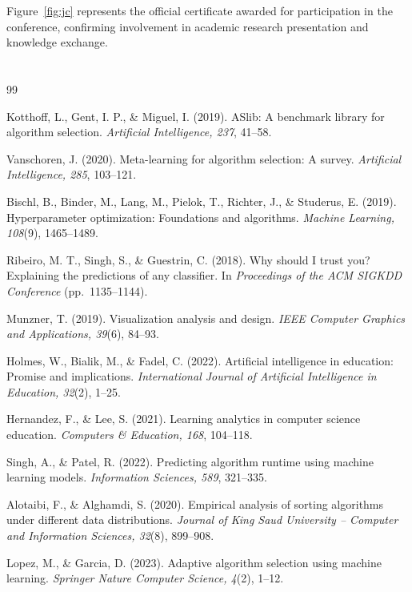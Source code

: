 \documentclass[12pt,a4paper,oneside,openany]{report}
\begin{document}
Figure~\ref{fig:jc} represents the official certificate awarded for participation in the conference, confirming involvement in academic research presentation and knowledge exchange.


\section*{}
\begin{thebibliography}{99}

Kotthoff, L., Gent, I. P., \& Miguel, I. (2019).
ASlib: A benchmark library for algorithm selection.
\textit{Artificial Intelligence, 237}, 41--58.

Vanschoren, J. (2020).
Meta-learning for algorithm selection: A survey.
\textit{Artificial Intelligence, 285}, 103--121.

Bischl, B., Binder, M., Lang, M., Pielok, T., Richter, J., \& Studerus, E. (2019).
Hyperparameter optimization: Foundations and algorithms.
\textit{Machine Learning, 108}(9), 1465--1489.

Ribeiro, M. T., Singh, S., \& Guestrin, C. (2018).
Why should I trust you? Explaining the predictions of any classifier.
In \textit{Proceedings of the ACM SIGKDD Conference} (pp.~1135--1144).

Munzner, T. (2019).
Visualization analysis and design.
\textit{IEEE Computer Graphics and Applications, 39}(6), 84--93.

Holmes, W., Bialik, M., \& Fadel, C. (2022).
Artificial intelligence in education: Promise and implications.
\textit{International Journal of Artificial Intelligence in Education, 32}(2), 1--25.

Hernandez, F., \& Lee, S. (2021).
Learning analytics in computer science education.
\textit{Computers \& Education, 168}, 104--118.

Singh, A., \& Patel, R. (2022).
Predicting algorithm runtime using machine learning models.
\textit{Information Sciences, 589}, 321--335.

Alotaibi, F., \& Alghamdi, S. (2020).
Empirical analysis of sorting algorithms under different data distributions.
\textit{Journal of King Saud University – Computer and Information Sciences, 32}(8), 899--908.

Lopez, M., \& Garcia, D. (2023).
Adaptive algorithm selection using machine learning.
\textit{Springer Nature Computer Science, 4}(2), 1--12.


\end{thebibliography}
\end{document}
